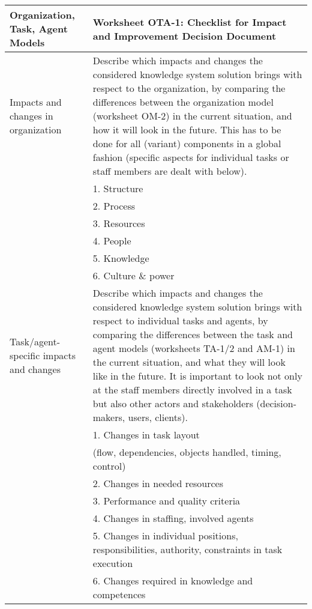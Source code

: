 \begin{tabular}%
       {|>{\colleft}p{3cm}%
        |>{\colleft}p{8cm}|}
\hline
  \bf Organization, Task, Agent Models &
  {\bf  Worksheet OTA-1: Checklist for Impact and Improvement Decision Document
  } \\
\hline
\hline
\sc Impacts and changes in organization &
   {\rm
   Describe which impacts and changes the considered knowledge system
   solution brings with respect to the organization, by comparing the
   differences between the organization model (worksheet OM-2) in the
   current situation, and how it will look in the future. This
   has to be done for all (variant) components in a global fashion
   (specific aspects for individual tasks or staff members are
   dealt with below).
   } \\
 & {\rm 1. Structure
           } \\
 & {\rm 2. Process
           } \\
 & {\rm 3. Resources
           } \\
 & {\rm 4. People
           } \\
 & {\rm 5. Knowledge
           } \\
 & {\rm 6. Culture \& power
           } \\
\hline
\sc Task/agent-specific impacts and changes &
   {\rm
   Describe which impacts and changes the considered knowledge system
   solution brings with respect to individual tasks and agents, by
   comparing the differences between the task and agent models
   (worksheets TA-1/2 and AM-1) in the current situation, and what they
   will look like in the future. It is important to look not only
   at the staff members directly involved in a task but also
   other actors and stakeholders (decision-makers, users, clients).
   } \\
 & {\rm 1. Changes in task layout} \\
 & {\rm (flow, dependencies, objects handled, timing, control)
           } \\
 & {\rm 2. Changes in needed resources
           } \\
 & {\rm 3. Performance and quality criteria
           } \\
 & {\rm 4. Changes in staffing, involved agents
           } \\
 & {\rm 5. Changes in individual positions, responsibilities,
           authority, constraints in task execution
           } \\
 & {\rm 6. Changes required in knowledge and competences
           } \\

\end{tabular}
